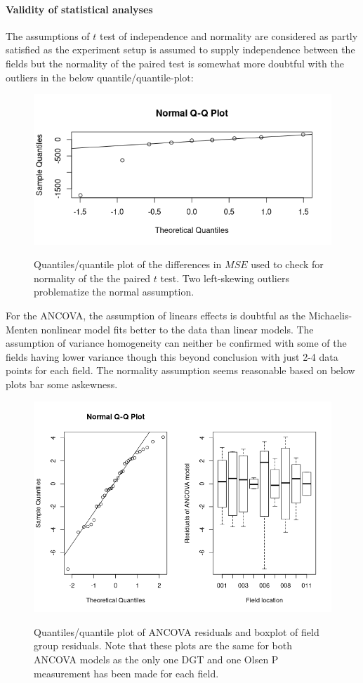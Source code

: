 \documentclass[11pt,fleqn]{article}
\begin{document}
\paragraph{Validity of statistical analyses} The assumptions of \(t\) test of independence and normality are considered as partly satisfied as the experiment setup is assumed to supply independence between the fields but the normality of the paired test is somewhat more doubtful with the outliers in the below quantile/quantile-plot:
\begin{figure}[H]
	\centering
	\includegraphics[width=.5\linewidth]{p2_t_qq}
	\label{fig:tqq}
	\caption{Quantiles/quantile plot of the differences in \(MSE\) used to check for normality of the the paired $t$ test. Two left-skewing outliers problematize the normal assumption.}
\end{figure} \noindent 
For the ANCOVA, the assumption of linears effects is doubtful as the Michaelis-Menten nonlinear model fits better to the data than linear models. The assumption of variance homogeneity can neither be confirmed with some of the fields having lower variance though this beyond conclusion with just 2-4 data points for each field. The normality assumption seems reasonable based on below plots bar some askewness.
\begin{figure}[H]
	\centering
	\includegraphics[width=.75\linewidth]{p2_ancova_qq}
	\label{fig:tqq}
	\caption{Quantiles/quantile plot of ANCOVA residuals and boxplot of field group residuals. Note that these plots are the same for both ANCOVA models as the only one DGT and one Olsen P measurement has been made for each field.}
\end{figure} \noindent 
\end{document}
